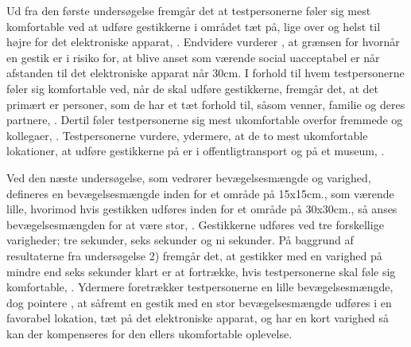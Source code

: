 Ud fra den første undersøgelse fremgår det at testpersonerne føler sig mest komfortable ved at udføre gestikkerne i området tæt på, lige over og helst til højre for det elektroniske apparat, \parencite[s. 197]{PDF:AreYouComfortableDoingThat}. Endvidere vurderer \textcite[s. 201]{PDF:AreYouComfortableDoingThat}, at grænsen for hvornår en gestik er i risiko for, at blive anset som værende social uacceptabel er når afstanden til det elektroniske apparat når 30cm. I forhold til hvem testpersonerne føler sig komfortable ved, når de skal udføre gestikkerne, fremgår det, at det primært er personer, som de har et tæt forhold til, såsom venner, familie og deres partnere, \parencite[s. 196]{PDF:AreYouComfortableDoingThat}. Dertil føler testpersonerne sig mest ukomfortable overfor fremmede og kollegaer, \parencite[s. 196]{PDF:AreYouComfortableDoingThat}. Testpersonerne vurdere, ydermere, at de to mest ukomfortable lokationer, at udføre gestikkerne på er i offentligtransport og på et museum, \parencite[s. 196]{PDF:AreYouComfortableDoingThat}. 

Ved den næste undersøgelse, som vedrører bevægelsesmængde og varighed, defineres en bevægelsesmængde inden for et område på 15x15cm., som værende lille, hvorimod hvis gestikken udføres inden for et område på 30x30cm., så anses bevægelsesmængden for at være stor, \parencite[s. 198]{PDF:AreYouComfortableDoingThat}. Gestikkerne udføres ved tre forskellige varigheder; tre sekunder, seks sekunder og ni sekunder. På baggrund af resultaterne fra undersøgelse 2) fremgår det, at gestikker med en varighed på mindre end seks sekunder klart er at fortrække, hvis testpersonerne skal føle sig komfortable, \parencite[s. 199]{PDF:AreYouComfortableDoingThat}. Ydermere foretrækker testpersonerne en lille bevægelsesmængde, dog pointere \textcite[s. 199]{PDF:AreYouComfortableDoingThat}, at såfremt en gestik med en stor bevægelsesmængde udføres i en favorabel lokation, tæt på det elektroniske apparat, og har en kort varighed så kan der kompenseres for den ellers ukomfortable oplevelse. 


